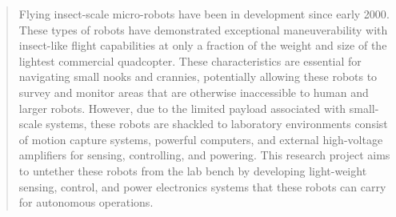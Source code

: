 \documentclass[../main.tex]{subfiles}
\begin{document}
\begin{abstract}
    Flying insect-scale micro-robots have been in development since early 2000\cite{4457871}. These types of robots have demonstrated exceptional maneuverability with insect-like flight capabilities\cite{9357346} at only a fraction of the weight and size of the lightest commercial quadcopter\cite{8046794}. These characteristics are essential for navigating small nooks and crannies, potentially allowing these robots to survey and monitor areas that are otherwise inaccessible to human and larger robots. However, due to the limited payload associated with small-scale systems, these robots are shackled to laboratory environments consist of motion capture systems, powerful computers, and external high-voltage amplifiers for sensing, controlling, and powering\cite{Hsiao_Kim_Ceron_Ren_Chen_2023}. This research project aims to untether these robots from the lab bench by developing light-weight sensing, control, and power electronics systems that these robots can carry for autonomous operations.
    
    
\end{abstract}
\end{document}
